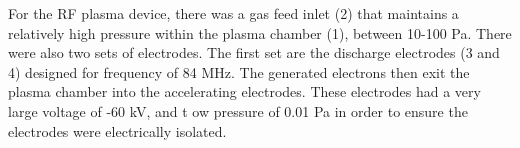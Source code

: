 For the RF plasma device, there was a gas feed inlet (2) that maintains a relatively high pressure within the plasma chamber (1), between 10-100 Pa. There were also two sets of electrodes. The first set are the discharge electrodes (3 and 4) designed for frequency of 84 MHz. The generated electrons then exit the plasma chamber into the accelerating electrodes. These electrodes had a very large voltage of -60 kV, and t ow pressure of 0.01 Pa in order to ensure the electrodes were electrically isolated.

